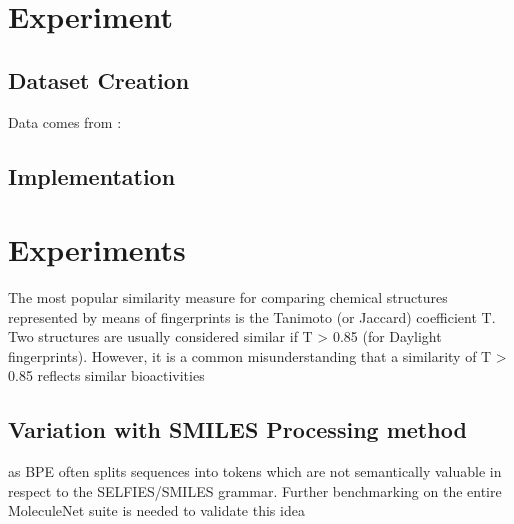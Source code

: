 \section{Experiment}
\subsection{Dataset Creation}
Data comes from :
\subsection{Implementation}

\section{Experiments}
The most popular similarity measure for comparing chemical structures represented by means of fingerprints is the Tanimoto (or Jaccard) coefficient T. Two structures are usually considered similar if T > 0.85 (for Daylight fingerprints). However, it is a common misunderstanding that a similarity of T > 0.85 reflects similar bioactivities
\subsection{Variation with SMILES Processing method}
 as BPE often splits sequences into tokens which are not
semantically valuable in respect to the SELFIES/SMILES grammar. Further benchmarking on the
entire MoleculeNet suite is needed to validate this idea

